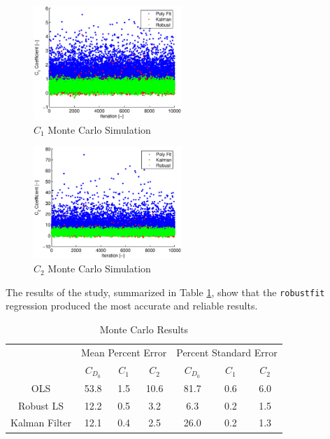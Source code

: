 \begin{figure}[H]
  \centering
    \includegraphics[width=0.5\textwidth]{figures/c1monteCarlo.eps}
      \caption{$C_1$ Monte Carlo Simulation}
      \label{fig:c1monteCarlo}
\end{figure}

\begin{figure}[H]
  \centering
    \includegraphics[width=0.5\textwidth]{figures/c2monteCarlo.eps}
      \caption{$C_2$ Monte Carlo Simulation}
      \label{fig:c2monteCarlo}
\end{figure}

The results of the study, summarized in Table \ref{table:monteCarlo}, show that the \texttt{robustfit} regression produced the most accurate and reliable results.

\begin{table}[ht]
\caption{Monte Carlo Results}
\label{table:monteCarlo}
\centering
\begin{tabular}{*7c}
\hline\hline
 &  \multicolumn{3}{c}{Mean Percent Error} & \multicolumn{3}{c}{Percent Standard Error}\\
 & $C_{D_0}$ & $C_1$ & $C_2$ & $C_{D_0}$ & $C_1$ & $C_2$\\
 \hline
OLS & 53.8 & 1.5 & 10.6 & 81.7 & 0.6 & 6.0\\
Robust LS & 12.2 & 0.5 & 3.2 & 6.3 & 0.2 & 1.5\\
Kalman Filter & 12.1 & 0.4 & 2.5 & 26.0 & 0.2 & 1.3\\
\hline
\end{tabular}
\end{table}